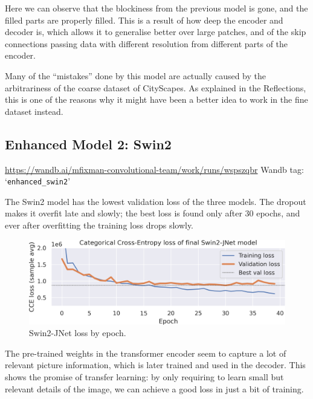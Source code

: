 Here we can observe that the blockiness from the previous model is gone, and the filled parts are properly filled.
This is a result of how deep the encoder and decoder is, which allows it to generalise better over large patches, and of the skip connections passing data with different resolution from different parts of the encoder.

Many of the ``mistakes'' done by this model are actually caused by the arbitrariness of the coarse dataset of CityScapes.
As explained in the Reflections, this is one of the reasons why it might have been a better idea to work in the fine dataset instead.

\newpage{}

\subsection{Enhanced Model 2: Swin2}
\begin{scriptsize}
	\vspace{-\parskip}
	\url{https://wandb.ai/mfixman-convolutional-team/work/runs/wspszqbr}
	\hfill{} Wandb tag: `\texttt{enhanced\_swin2}'
\end{scriptsize}

The Swin2 model has the lowest validation loss of the three models.
The dropout makes it overfit late and slowly; the best loss is found only after 30 epochs, and ever after overfitting the training loss drops slowly.

\begin{figure}[h]
	\centering
	\includegraphics[width=.9\textwidth]{swin2_loss.png}
	\caption{Swin2-JNet loss by epoch.}
\end{figure}

The pre-trained weights in the transformer encoder seem to capture a lot of relevant picture information, which is later trained and used in the decoder.
This shows the promise of transfer learning: by only requiring to learn small but relevant details of the image, we can achieve a good loss in just a bit of training.

